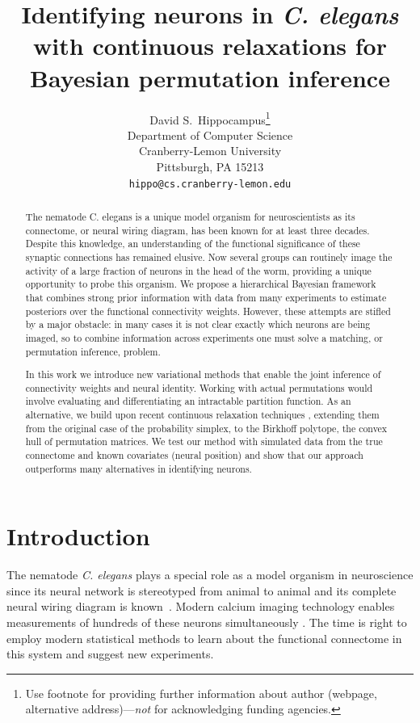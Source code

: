 \documentclass{article}
\title{Identifying neurons in \textit{C. elegans} with continuous relaxations for Bayesian permutation inference}
\author{
  David S.~Hippocampus\thanks{Use footnote for providing further
    information about author (webpage, alternative
    address)---\emph{not} for acknowledging funding agencies.} \\
  Department of Computer Science\\
  Cranberry-Lemon University\\
  Pittsburgh, PA 15213 \\
  \texttt{hippo@cs.cranberry-lemon.edu} \\
}
\begin{document}

\maketitle

\begin{abstract}
  The nematode C. elegans is a unique model organism for
  neuroscientists as its connectome, or neural wiring diagram, has
  been known for at least three decades. Despite this knowledge, an
  understanding of the functional significance of these synaptic
  connections has remained elusive. Now several groups can routinely
  image the activity of a large fraction of neurons in the head of the
  worm, providing a unique opportunity to probe this organism. We
  propose a hierarchical Bayesian framework that combines strong
  prior information with data from many experiments to estimate
  posteriors over the functional connectivity weights. However, these
  attempts are stifled by a major obstacle: in many cases it is not
  clear exactly which neurons are being imaged, so to combine
  information across experiments one must solve a matching, or
  permutation inference, problem.

  In this work we introduce new variational methods that enable the
  joint inference of connectivity weights and neural identity. Working
  with actual permutations would involve evaluating and
  differentiating an intractable partition function. As an
  alternative, we build upon recent continuous relaxation techniques
  \citep{Jang2016, Maddison2016}, extending them from the
  original case of the probability simplex, to the Birkhoff polytope,
  the convex hull of permutation matrices. We test our method with
  simulated data from the true connectome and known
  covariates (neural position) and show that our approach outperforms
  many alternatives in identifying neurons.
\end{abstract}



\section{Introduction}
The nematode \textit{C. elegans} plays a special role as a model
organism in neuroscience since its neural network is stereotyped from
animal to animal and its complete neural wiring diagram is
known~\citep{varshney2011structural}.  Modern calcium imaging
technology enables measurements of hundreds of these neurons
simultaneously \citep{Kato2015, nguyen2016whole}. The time is
right to employ modern statistical methods to learn about the
functional connectome in this system and suggest new experiments.
\end{document}
